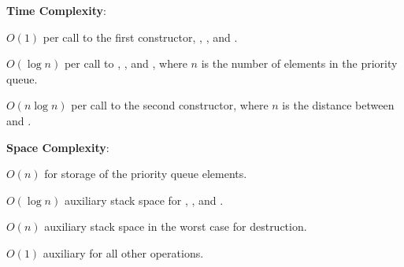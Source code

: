 \textbf{Time Complexity}:
\begin{compactitem}
  \item $O(1)$ per call to the first constructor, , , and .
  \item $O(\log n)$ per call to , , and , where $n$ is the number of elements in the priority queue.
  \item $O(n \log n)$ per call to the second constructor, where $n$ is the distance between  and .
\end{compactitem}

\textbf{Space Complexity}:
\begin{compactitem}
  \item $O(n)$ for storage of the priority queue elements.
  \item $O(\log n)$ auxiliary stack space for , , and .
  \item $O(n)$ auxiliary stack space in the worst case for destruction.
  \item $O(1)$ auxiliary for all other operations.
\end{compactitem}

